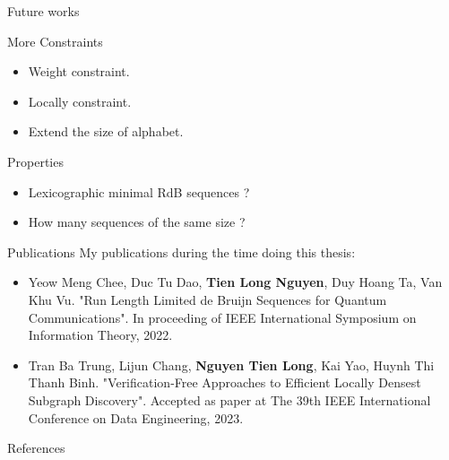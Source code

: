 \begin{frame}{Future works}
    \vfill\begin{block}{More Constraints}
        \begin{itemize}
            \item Weight constraint.
            \item Locally constraint.
            \item Extend the size of alphabet.
        \end{itemize}
    \end{block}
    
            
    
    \vfill\begin{block}{Properties}
        \begin{itemize}
            \item Lexicographic minimal RdB sequences ?
            \item How many sequences of the same size ?
        \end{itemize}
    \end{block}
\end{frame}

\begin{frame}{Publications}
    My publications during the time doing this thesis:
    \begin{itemize}
        \item Yeow Meng Chee, Duc Tu Dao, \textbf{Tien Long Nguyen}, Duy Hoang Ta, Van Khu Vu. "Run Length Limited de Bruijn Sequences for Quantum Communications". In proceeding of IEEE International Symposium on Information Theory, 2022.
        \item Tran Ba Trung, Lijun Chang, \textbf{Nguyen Tien Long}, Kai Yao, Huynh Thi Thanh Binh. "Verification-Free Approaches to Efficient Locally Densest Subgraph Discovery". Accepted as paper at The 39th IEEE International Conference on Data Engineering, 2023.
    \end{itemize}
\end{frame}

\begin{frame}[allowframebreaks]{References}
    \printbibliography
\end{frame}